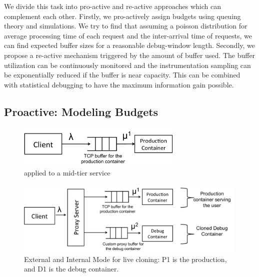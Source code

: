 We divide this task into  pro-active and re-active approaches which can complement each other. Firstly, we pro-actively assign budgets using queuing theory and simulations. We try to find that assuming a poisson distribution for average processing time of each request and the inter-arrival time of requests, we can find expected buffer sizes for a reasonable debug-window length. Secondly, we propose a re-active mechanism triggered by the amount of buffer used. The buffer utilization can be continuously monitored and the instrumentation sampling can be exponentially reduced if the buffer is near capacity. This can be combined with statistical debugging to have the maximum information gain possible. 

\subsection{Proactive: Modeling Budgets}
\label{sec:activeProactiveModeling}


\begin{figure}[t!]

		\centering
		\includegraphics[width=0.7\textwidth]{queue/figs/queue.pdf}
		\caption{\parikshan applied to a mid-tier service}
		\label{fig:queueModel}
\end{figure}
\begin{figure}
		\centering
		\includegraphics[width=0.99\textwidth]{queue/figs/queueCloned.pdf}
		\caption{External and Internal Mode for live cloning: P1 is the production, and D1 is the debug container.}
		\label{fig:queueClonedModel}
\end{figure}
	

